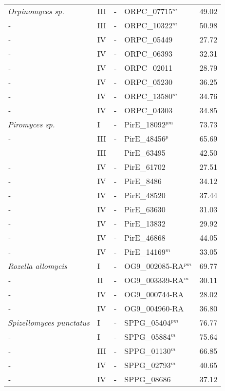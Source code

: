 {{\begin{longtable}{llllr}
  \emph{Orpinomyces sp.} & III & - & ORPC\_07715$^{m}$ & 49.02 \\ 
  \emph{-} & III & - & ORPC\_10322$^{m}$ & 50.98 \\ 
  \emph{-} & IV & - & ORPC\_05449 & 27.72 \\ 
  \emph{-} & IV & - & ORPC\_06393 & 32.31 \\ 
  \emph{-} & IV & - & ORPC\_02011 & 28.79 \\ 
  \emph{-} & IV & - & ORPC\_05230 & 36.25 \\ 
  \emph{-} & IV & - & ORPC\_13580$^{m}$ & 34.76 \\ 
  \emph{-} & IV & - & ORPC\_04303 & 34.85 \\ 
  \emph{Piromyces sp. } & I & - & PirE\_18092$^{pm}$ & 73.73 \\ 
  \emph{-} & III & - & PirE\_48456$^{p}$ & 65.69 \\ 
  \emph{-} & III & - & PirE\_63495 & 42.50 \\ 
  \emph{-} & IV & - & PirE\_61702 & 27.51 \\ 
  \emph{-} & IV & - & PirE\_8486 & 34.12 \\ 
  \emph{-} & IV & - & PirE\_48520 & 37.44 \\ 
  \emph{-} & IV & - & PirE\_63630 & 31.03 \\ 
  \emph{-} & IV & - & PirE\_13832 & 29.92 \\ 
  \emph{-} & IV & - & PirE\_46868 & 44.05 \\ 
  \emph{-} & IV & - & PirE\_14169$^{m}$ & 33.05 \\ 
  \emph{Rozella allomycis } & I & - & OG9\_002085-RA$^{pm}$ & 69.77 \\ 
  \emph{-} & II & - & OG9\_003339-RA$^{m}$ & 30.11 \\ 
  \emph{-} & IV & - & OG9\_000744-RA & 28.02 \\ 
  \emph{-} & IV & - & OG9\_004960-RA & 36.80 \\ 
  \emph{Spizellomyces punctatus } & I & - & SPPG\_05404$^{pm}$ & 76.77 \\ 
  \emph{-} & I & - & SPPG\_05884$^{m}$ & 75.64 \\ 
  \emph{-} & III & - & SPPG\_01130$^{m}$ & 66.85 \\ 
  \emph{-} & IV & - & SPPG\_02793$^{m}$ & 40.65 \\ 
  \emph{-} & IV & - & SPPG\_08686 & 37.12 \\ 
   \hline
\end{longtable}
} %
} %
